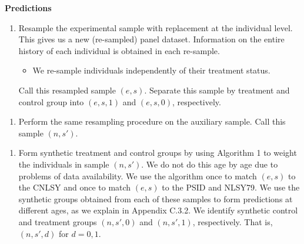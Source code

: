 \documentclass[static]{JJH-Beamer}
\begin{document}
\begin{frame}

\begin{center}
\textbf{Predictions}\label{appendix:bootstrapspreds}
\end{center}

\end{frame}

\begin{frame}

\begin{enumerate}[1.]
\item Resample the experimental sample with replacement at the individual level. This gives us a new (re-sampled) panel dataset. Information on the entire history of each individual is obtained in each re-sample.
\begin{itemize}
\item We re-sample individuals independently of their treatment status.
\end{itemize}
Call this resampled sample $(e,s)$. Separate this sample by treatment and control group into $(e,s,1)$ and $(e,s,0)$, respectively.
\end{enumerate}

\end{frame}

\begin{frame}

\begin{enumerate}[2.]
\item Perform the same resampling procedure on the auxiliary sample. Call this sample $(n,s')$.
\end{enumerate}

\end{frame}

\begin{frame}

\begin{enumerate}[3.]
\item Form synthetic treatment and control groups by using Algorithm 1 to weight the individuals in sample $(n,s')$. We do not do this age by age due to problems of data availability. We use the algorithm once to match $(e,s)$ to the CNLSY and once to match $(e,s)$ to the PSID and NLSY79. We use the synthetic groups obtained from each of these samples to form predictions at different ages, as we explain in Appendix C.3.2. We identify synthetic control and treatment groups $(n,s',0)$ and $(n,s',1)$, respectively. That is, $(n,s',d)$ for $d = {0,1}$.
\end{enumerate}

\end{frame}
\end{document}
